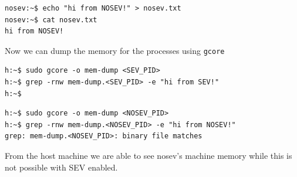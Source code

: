 \documentclass[twocolumn]{article}
\begin{document}
\begin{verbatim}
nosev:~$ echo "hi from NOSEV!" > nosev.txt
nosev:~$ cat nosev.txt
hi from NOSEV!
\end{verbatim}

Now we can dump the memory for the processes using \texttt{gcore}

\begin{verbatim}
h:~$ sudo gcore -o mem-dump <SEV_PID>
h:~$ grep -rnw mem-dump.<SEV_PID> -e "hi from SEV!"
h:~$
\end{verbatim}

\begin{verbatim}
h:~$ sudo gcore -o mem-dump <NOSEV_PID>
h:~$ grep -rnw mem-dump.<NOSEV_PID> -e "hi from NOSEV!"
grep: mem-dump.<NOSEV_PID>: binary file matches
\end{verbatim}

From the host machine we are able to see nosev's machine memory while this is not possible with SEV enabled.
\end{document}
